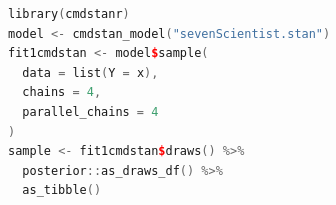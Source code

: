 \begin{lstlisting}[language=C++,label={code:18_04},caption={cmdstanrパッケージによる呼び出し}]
library(cmdstanr)
model <- cmdstan_model("sevenScientist.stan")
fit1cmdstan <- model$sample(
  data = list(Y = x),
  chains = 4,
  parallel_chains = 4
)
sample <- fit1cmdstan$draws() %>% 
  posterior::as_draws_df() %>% 
  as_tibble()
\end{lstlisting}
